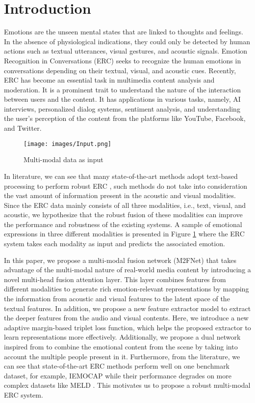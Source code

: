 \documentclass[10pt,twocolumn,letterpaper]{article}
\begin{document}
\section{Introduction}
Emotions are the unseen mental states that are linked to thoughts and feelings\cite{Poria2019Emotion}. In the absence of physiological indications, they could only be detected by human actions such as textual utterances, visual gestures, and acoustic signals. Emotion Recognition in Conversations (ERC) seeks to recognize the human emotions in conversations depending on their textual, visual, and acoustic cues. Recently, ERC has become an essential task in multimedia content analysis and moderation. It is a prominent trait to understand the nature of the interaction between users and the content. It has applications in various tasks, namely, AI interviews, personalized dialog systems, sentiment analysis, and understanding the user's perception of the content from the platforms like YouTube, Facebook, and Twitter\cite{Poria2019Emotion}.
\begin{figure}[t!]
    \centering
    \texttt{[image: images/Input.png]}
    \caption{Multi-modal data as input}
    \label{fig:input1}
\end{figure}

In literature, we can see that many state-of-the-art methods adopt text-based processing to perform robust ERC \cite{kim2021emoberta, DBLP:journals/corr/abs-2010-02795}, such methods do not take into consideration the vast amount of information present in the acoustic and visual modalities. Since the ERC data mainly consists of all three modalities, i.e., text, visual, and acoustic, we hypothesize that the robust fusion of these modalities can improve the performance and robustness of the existing systems. A sample of emotional expressions in three different modalities is presented in Figure \ref{fig:input1} where the ERC system takes each modality as input and predicts the associated emotion.

In this paper, we propose a multi-modal fusion network (M2FNet) that takes advantage of the multi-modal nature of real-world media content by introducing a novel multi-head fusion attention layer. This layer combines features from different modalities to generate rich emotion-relevant representations by mapping the information from acoustic and visual features to the latent space of the textual features. In addition, we propose a new feature extractor model to extract the deeper features from the audio and visual contents. Here, we introduce a new adaptive margin-based triplet loss function, which helps the proposed extractor to learn representations more effectively. Additionally, we propose a dual network inspired from \cite{lee2019context} to combine the emotional content from the scene by taking into account the multiple people present in it. Furthermore, from the literature, we can see that state-of-the-art ERC methods perform well on one benchmark dataset, for example, IEMOCAP \cite{Busso2008IEMOCAPIE} while their performance degrades on more complex datasets like MELD \cite{poria2018meld}. This motivates us to propose a robust multi-modal ERC system. 
\end{document}
